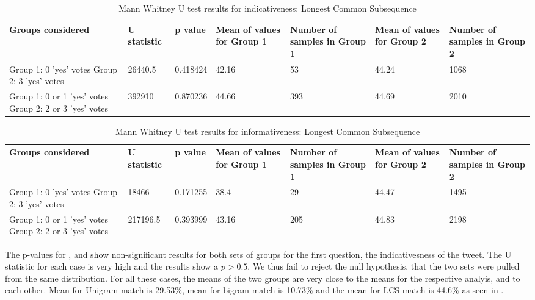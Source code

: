 \begin{table}[!htbp]
\caption{Mann Whitney U test results for indicativeness: Longest Common Subsequence}
\centering
\label{tab:lcscorr1}
\begin{tabular}{|p{}|p{}|p{}|p{}|p{}|p{}|p{}|}
\hline
Groups considered    & U statistic & p value & Mean of values for Group 1 & Number of samples in Group 1 & Mean of values for Group 2 & Number of samples in Group 2\\ \hline
Group 1: 0 'yes' votes \newline Group 2: 3 'yes' votes &  26440.5  &  0.418424  &  42.16  & 53 &  44.24 &   1068  \\ \hline
Group 1: 0 or 1 'yes' votes \newline Group 2: 2 or 3 'yes' votes  &  392910     & 0.870236 &  44.66  & 393 & 44.69 & 2010 \\ \hline
\end{tabular}
\end{table}

\begin{table}[!htbp]
\centering
\caption{Mann Whitney U test results for informativeness: Longest Common Subsequence}
\label{tab:lcscorr2}
\begin{tabular}{|p{}|p{}|p{}|p{}|p{}|p{}|p{}|}
\hline
Groups considered    & U statistic & p value & Mean of values for Group 1 & Number of samples in Group 1 & Mean of values for Group 2 & Number of samples in Group 2\\ \hline
Group 1: 0 'yes' votes \newline Group 2: 3 'yes' votes & 18466   & 0.171255 & 38.4 & 29 & 44.47  & 1495 \\ \hline
Group 1: 0 or 1 'yes' votes \newline Group 2: 2 or 3 'yes' votes & 217196.5      &  0.393999    & 43.16    & 205 & 44.83   &  2198\\ \hline
\end{tabular}
\end{table}

The p-values for ,  and  show non-significant results for both sets of groups for the first question, the indicativesness of the tweet. The U statistic for each case is very high and the results show a $p>0.5$. We thus fail to reject the null hypothesis, that the two sets were pulled from the same distribution. For all these cases, the means of the two groups are very close to the means for the respective analyis, and to each other. Mean for Unigram match is 29.53\%, mean for bigram match is 10.73\% and the mean for LCS match is 44.6\% as seen in . 

